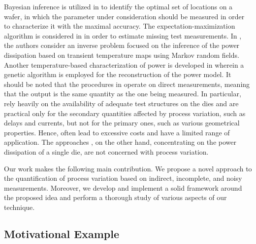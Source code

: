 Bayesian inference is utilized in \cite{zhang2010} to identify the optimal set
of locations on a wafer, in which the parameter under consideration should be
measured in order to characterize it with the maximal accuracy. The
expectation-maximization algorithm is considered in \cite{reda2009} in order to
estimate missing test measurements. In \cite{paek2012}, the authors consider an
inverse problem focused on the inference of the power dissipation based on
transient temperature maps using Markov random fields. Another temperature-based
characterization of power is developed in \cite{mesa-martinez2007} wherein a
genetic algorithm is employed for the reconstruction of the power model. It
should be noted that the procedures in \cite{zhang2010, reda2009} operate on
direct measurements, meaning that the output is the same quantity as the one
being measured. In particular, \cite{zhang2010, reda2009} rely heavily on the
availability of adequate test structures on the dies and are practical only for
the secondary quantities affected by process variation, such as delays and
currents, but not for the primary ones, such as various geometrical properties.
Hence, \cite{zhang2010, reda2009} often lead to excessive costs and have a
limited range of application. The approaches \cite{paek2012, mesa-martinez2007},
on the other hand, concentrating on the power dissipation of a single die, are
not concerned with process variation.

Our work makes the following main contribution. We propose a novel approach to
the quantification of process variation based on indirect, incomplete, and noisy
measurements. Moreover, we develop and implement a solid framework around the
proposed idea and perform a thorough study of various aspects of our technique.

\subsection{Motivational Example}

